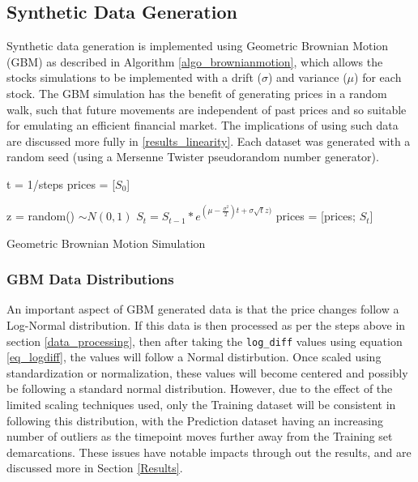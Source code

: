 \documentclass[a4paper,11pt,oneside]{article}
\theoremstyle{plain}
\theoremstyle{definition}
\begin{document}
\subsection{Synthetic Data Generation}\label{data_synthetic}

Synthetic data generation is implemented using Geometric Brownian Motion (GBM) as described in Algorithm \ref{algo_brownianmotion}, which allows the stocks simulations to be implemented with a drift ($\sigma$) and variance ($\mu$) for each stock. The GBM simulation has the benefit of generating prices in a random walk, such that future movements are independent of past prices and so suitable for emulating an efficient financial market. The implications of using such data are discussed more fully in \ref{results_linearity}. Each dataset was generated with a random seed (using a Mersenne Twister pseudorandom number generator). \newline

\begin{algorithm}[H]

	t = 1/steps\;
	prices = [$S_0$]\;

	{
		z = random()  $\sim N(0,1)$\;
		$S_t = S_{t-1}*e^{(\mu - \frac {\sigma^2}{2})t + \sigma  \sqrt{t}  z)}$\;
		prices = [prices; $S_t$]\;
	}
	\label{algo_brownianmotion}
	\caption{Geometric Brownian Motion Simulation}
\end{algorithm}

\subsubsection{GBM Data Distributions}

An important aspect of GBM generated data is that the price changes follow a Log-Normal distribution. If this data is then processed as per the steps above in section \ref{data_processing}, then after taking the \texttt{log\_diff} values using equation \eqref{eq_logdiff}, the values will follow a Normal distirbution. Once scaled using standardization or normalization, these values will become centered and possibly be following a standard normal distribution. However, due to the effect of the limited scaling techniques used, only the Training dataset will be consistent in following this distribution, with the Prediction dataset having an increasing number of outliers as the timepoint moves further away from the Training set demarcations. These issues have notable impacts through out the results, and are discussed more in Section \ref{Results}.
\end{document}
